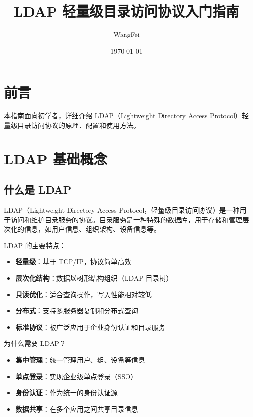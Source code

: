 \documentclass[12pt,UTF8]{ctexbook}
\title{\heiti\zihao{0} LDAP 轻量级目录访问协议入门指南}
\author{WangFei}
\date{\today}
\begin{document}
\maketitle
\tableofcontents

\frontmatter
\chapter{前言}

本指南面向初学者，详细介绍 LDAP（Lightweight Directory Access Protocol）轻量级目录访问协议的原理、配置和使用方法。

\mainmatter

\chapter{LDAP 基础概念}
\label{chap:ldap_basics}

\section{什么是 LDAP}
\label{sec:what_is_ldap}

LDAP（Lightweight Directory Access Protocol，轻量级目录访问协议）是一种用于访问和维护目录服务的协议。目录服务是一种特殊的数据库，用于存储和管理层次化的信息，如用户信息、组织架构、设备信息等。

LDAP 的主要特点：
\begin{itemize}
    \item \textbf{轻量级}：基于 TCP/IP，协议简单高效
    \item \textbf{层次化结构}：数据以树形结构组织（LDAP 目录树）
    \item \textbf{只读优化}：适合查询操作，写入性能相对较低
    \item \textbf{分布式}：支持多服务器复制和分布式查询
    \item \textbf{标准协议}：被广泛应用于企业身份认证和目录服务
\end{itemize}

为什么需要 LDAP？
\begin{itemize}
    \item \textbf{集中管理}：统一管理用户、组、设备等信息
    \item \textbf{单点登录}：实现企业级单点登录（SSO）
    \item \textbf{身份认证}：作为统一的身份认证源
    \item \textbf{数据共享}：在多个应用之间共享目录信息
\end{itemize}
\end{document}
